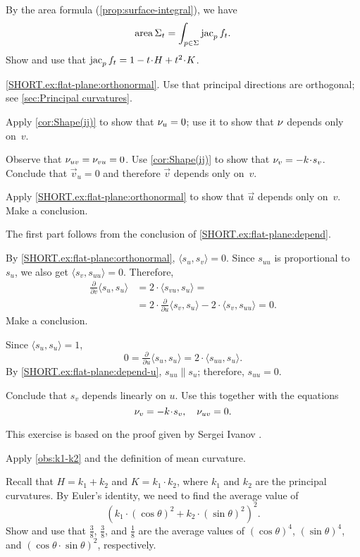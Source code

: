 \begin{multicols}{2}
 By the area formula (\ref{prop:surface-integral}), we have
\[\mathop{\rm area}\nolimits\Sigma_t=\int_{p\in \Sigma}\mathop{\rm jac}\nolimits_pf_t.\]
Show and use that $\jac_pf_t=1-t\cdot H+t^2\cdot K$.

\parbf{\ref{ex:flat-plane};} \ref{SHORT.ex:flat-plane:orthonormal}.
Use that principal directions are orthogonal; see \ref{sec:Principal curvatures}.

Apply \ref{cor:Shape(ij)} to show that $\nu_u=0$; use it to show that $\nu$ depends only on~$v$.

Observe that $\nu_{uv}=\nu_{vu}=0$.
Use \ref{cor:Shape(ij)} to show that $\Norm_v=-k \cdot s_v$.
Conclude that $\vec v_u=0$ and therefore $\vec v$ depends only on~$v$.

Apply \ref{SHORT.ex:flat-plane:orthonormal} to show that $\vec u$ depends only on~$v$.
Make a conclusion.

The first part follows from the conclusion of \ref{SHORT.ex:flat-plane:depend}.

By \ref{SHORT.ex:flat-plane:orthonormal}, $\langle s_u,s_v\rangle=0$.
Since $s_{uu}$ is proportional to $s_u$, we also get $\langle s_{v},s_{uu}\rangle=0$.
Therefore,
\begin{align*}
\tfrac{\partial}{\partial v}\langle s_u,s_u\rangle&=2\cdot \langle s_{vu},s_u\rangle=
\\
&=2\cdot \tfrac{\partial}{\partial u}\langle s_v,s_u\rangle-2\cdot \langle s_{v},s_{uu}\rangle=0.
\end{align*}
Make a conclusion.

Since $\langle s_u,s_u\rangle=1$,
\[0=\tfrac{\partial}{\partial u}\langle s_u,s_u\rangle=2\cdot\langle s_{uu},s_u\rangle.\]
By \ref{SHORT.ex:flat-plane:depend-u}, $s_{uu}\parallel s_u$; therefore, $s_{uu}=0$.

Conclude that $s_v$ depends linearly on $u$.
Use this together with the equations
\[\Norm_v=-k\cdot s_v,\quad \Norm_{uv}=0.\]

This exercise is based on the proof given by Sergei Ivanov \cite[3$^\text{d}$ Sem. Lect. 13]{ivanov}.

Apply \ref{obs:k1-k2} and the definition of mean curvature.

Recall that $H=k_1+k_2$ and $K=k_1\cdot k_2$, where $k_1$ and $k_2$ are the principal curvatures.
By Euler's identity, we need to find the average value of 
\[(k_1\cdot (\cos\theta)^2+k_2\cdot (\sin\theta)^2)^2.\]
Show and use that $\tfrac38$, $\tfrac38$, and $\tfrac18$ are the average values of $(\cos\theta)^4$, $(\sin\theta)^4$, and $(\cos\theta\cdot \sin\theta)^2$, respectively.



\end{multicols}
